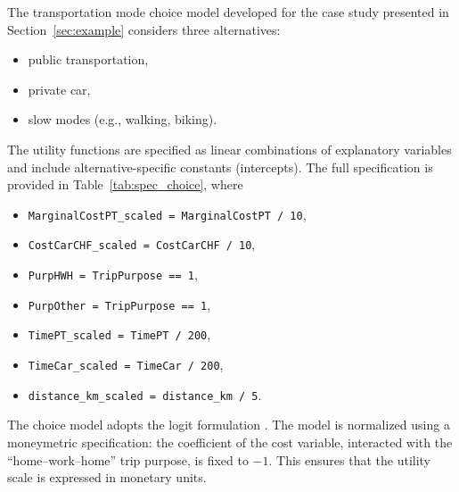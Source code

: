 \documentclass[12pt,a4paper]{article}
\begin{document}
The transportation mode choice model developed for the case study presented in Section~\ref{sec:example} considers three alternatives:
\begin{itemize}
\item public transportation,
\item private car,
\item slow modes (e.g., walking, biking).
\end{itemize}
The utility functions are specified as linear combinations of explanatory variables and include alternative-specific constants (intercepts). The full specification is provided in Table~\ref{tab:spec_choice}, where
\begin{itemize}
\item \lstinline $MarginalCostPT_scaled = MarginalCostPT / 10$,
\item \lstinline $CostCarCHF_scaled = CostCarCHF / 10$,
\item \lstinline $PurpHWH = TripPurpose == 1$,
\item \lstinline $PurpOther = TripPurpose == 1$,
\item \lstinline $TimePT_scaled = TimePT / 200$,
\item \lstinline $TimeCar_scaled = TimeCar / 200$,
\item \lstinline $distance_km_scaled = distance_km / 5$.
\end{itemize}


The choice model adopts the logit formulation .
The model is normalized using a moneymetric specification: the coefficient of the cost variable, interacted with the ``home–work–home'' trip purpose, is fixed to \(-1\). This ensures that the utility scale is expressed in monetary units.
\end{document}
